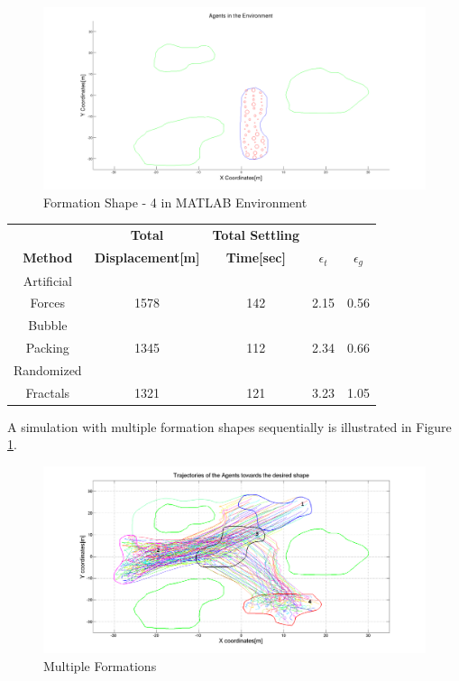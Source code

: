 \begin{figure}[H]
\caption{Formation Shape - 4 in MATLAB Environment}
\centerline{\includegraphics[scale = 0.32]{4}}
\end{figure} 
			
	
\begin{center}
 \label{perf_shape4} 
\begin{tabular}{|c|c|c|c|c|}
					
\hline
\textbf{} & \textbf{Total}  & \textbf{Total Settling} & \textbf{} & \textbf{} \\ \textbf{Method} & \textbf{Displacement[m]} & \textbf{Time[sec]}& \textbf{$\epsilon_t$} & \textbf{$\epsilon_g$} \\
\hline
Artificial&  &  &  & \\
 Forces & 1578 & 142& 2.15 & 0.56\\
 \hline
 Bubble&  &  &  & \\
 Packing &1345 &112 &2.34 & 0.66\\
\hline
 Randomized&  &  &  & \\
 Fractals &1321 &121 &3.23 & 1.05\\
\hline
\end{tabular}
\end{center}
		
A simulation with multiple formation shapes sequentially is illustrated in Figure \ref{multiple_formation_ref}.

\begin{figure}[H]
\caption{Multiple Formations} \label{multiple_formation_ref}
\centerline{\includegraphics[scale = 0.33]{multiple_formation}}
\end{figure} 
		
